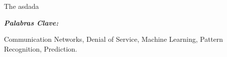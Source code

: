 
\setcounter{page}{5}
	
	The asdada


\textit{\textbf{Palabras Clave:}}

Communication Networks, Denial of Service, Machine Learning, Pattern Recognition, Prediction.
	
		
\vfill
\newpage %
\thispagestyle{empty}
\mbox{}